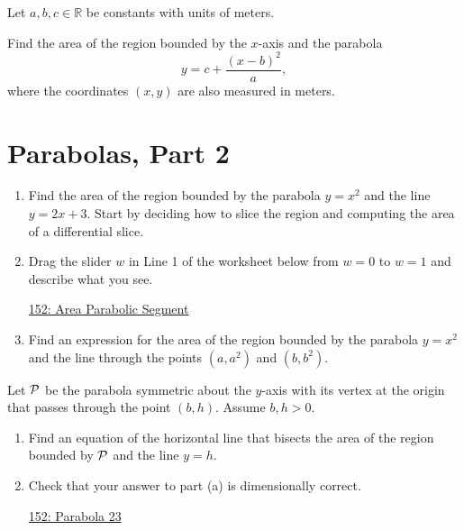 \documentclass{ximera}
\begin{document}
\begin{question} \label{QPERer3943}
Let $a,b,c\in \mathbb{R}$ be constants with units of meters.

Find the area of the region bounded by the $x$-axis and the parabola
\[
      y = c+ \frac{(x-b)^2}{a} ,
\]
where the coordinates $(x,y)$ are also measured in meters.
\end{question}


\section{Parabolas, Part 2}

\begin{question} \label{QKdf3rr3}
\begin{enumerate}
\item Find the area of the region bounded by the parabola $y=x^2$ and the line $y=2x+3$. Start by deciding how to slice the region and computing the area of a differential slice.

\item Drag the slider $w$ in Line 1 of the worksheet below from $w=0$ to $w=1$ and describe what you see.

\begin{onlineOnly}
    \begin{center}
\end{center}
\end{onlineOnly}

\href{https://www.desmos.com/calculator/vci24vc4f1}{152: Area Parabolic Segment}

\item Find an expression for the area of the region bounded by the parabola $y=x^2$ and the line through the points $(a,a^2)$ and $(b,b^2)$.

\end{enumerate}
\end{question}

\begin{question} \label{Q88w88ewe}
Let ${\cal P}$ be the parabola symmetric about the $y$-axis with its vertex at the origin that passes through the point $(b,h)$. Assume $b,h>0$.

\begin{enumerate}

\item Find an equation of the horizontal line that bisects the area of the region bounded by ${\cal P}$ and the line $y=h$.

\item Check that your answer to part (a) is dimensionally correct.

\begin{onlineOnly}
    \begin{center}
\end{center}
\end{onlineOnly}

\href{https://www.desmos.com/calculator/mbxrsmdho8}{152: Parabola 23}

\end{enumerate}
\end{question}
\end{document}
